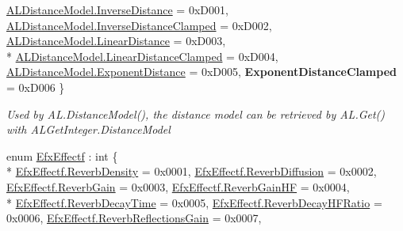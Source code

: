 \begin{DoxyCompactItemize}
\hyperlink{namespace_open_t_k_1_1_audio_1_1_open_a_l_ac70a7de41b3623396e48d614cc5f032ca425b2bd99b7e5e7bb4d6bdb16061fefa}{A\-L\-Distance\-Model.\-Inverse\-Distance} = 0x\-D001, 
\hyperlink{namespace_open_t_k_1_1_audio_1_1_open_a_l_ac70a7de41b3623396e48d614cc5f032caa1995a4ec45da3b68199b98b3387e363}{A\-L\-Distance\-Model.\-Inverse\-Distance\-Clamped} = 0x\-D002, 
\hyperlink{namespace_open_t_k_1_1_audio_1_1_open_a_l_ac70a7de41b3623396e48d614cc5f032caf0269460db42aaeae937d33fa7584810}{A\-L\-Distance\-Model.\-Linear\-Distance} = 0x\-D003, 
\\*
\hyperlink{namespace_open_t_k_1_1_audio_1_1_open_a_l_ac70a7de41b3623396e48d614cc5f032ca6251affeb37ebdc4a61f7055d929d7b1}{A\-L\-Distance\-Model.\-Linear\-Distance\-Clamped} = 0x\-D004, 
\hyperlink{namespace_open_t_k_1_1_audio_1_1_open_a_l_ac70a7de41b3623396e48d614cc5f032ca6f69922d830216f31901d27502565a0e}{A\-L\-Distance\-Model.\-Exponent\-Distance} = 0x\-D005, 
{\bfseries Exponent\-Distance\-Clamped} = 0x\-D006
 \}
\begin{DoxyCompactList}\small\item\em Used by A\-L.\-Distance\-Model(), the distance model can be retrieved by A\-L.\-Get() with A\-L\-Get\-Integer.\-Distance\-Model\end{DoxyCompactList}\item 
enum \hyperlink{namespace_open_t_k_1_1_audio_1_1_open_a_l_aa0356299908369b4365d28572c0ec20b}{Efx\-Effectf} \-: int \{ \\*
\hyperlink{namespace_open_t_k_1_1_audio_1_1_open_a_l_aa0356299908369b4365d28572c0ec20baa309c309aacff6853b7d850faded3dab}{Efx\-Effectf.\-Reverb\-Density} = 0x0001, 
\hyperlink{namespace_open_t_k_1_1_audio_1_1_open_a_l_aa0356299908369b4365d28572c0ec20bafb03c552a725a0362e322f3476fdc419}{Efx\-Effectf.\-Reverb\-Diffusion} = 0x0002, 
\hyperlink{namespace_open_t_k_1_1_audio_1_1_open_a_l_aa0356299908369b4365d28572c0ec20bac7988492860bf468c1be6f7da59d1722}{Efx\-Effectf.\-Reverb\-Gain} = 0x0003, 
\hyperlink{namespace_open_t_k_1_1_audio_1_1_open_a_l_aa0356299908369b4365d28572c0ec20ba85b4782d7ca3ac56d6f8c211fb98cd92}{Efx\-Effectf.\-Reverb\-Gain\-H\-F} = 0x0004, 
\\*
\hyperlink{namespace_open_t_k_1_1_audio_1_1_open_a_l_aa0356299908369b4365d28572c0ec20ba648b5b1b867392c46cbaa2ce40e90389}{Efx\-Effectf.\-Reverb\-Decay\-Time} = 0x0005, 
\hyperlink{namespace_open_t_k_1_1_audio_1_1_open_a_l_aa0356299908369b4365d28572c0ec20ba46ed64e6d4618ef7bc5b0deb3aa7a069}{Efx\-Effectf.\-Reverb\-Decay\-H\-F\-Ratio} = 0x0006, 
\hyperlink{namespace_open_t_k_1_1_audio_1_1_open_a_l_aa0356299908369b4365d28572c0ec20ba3c5c7b5f71e753e7636feafce322c501}{Efx\-Effectf.\-Reverb\-Reflections\-Gain} = 0x0007, 

\end{DoxyCompactItemize}
